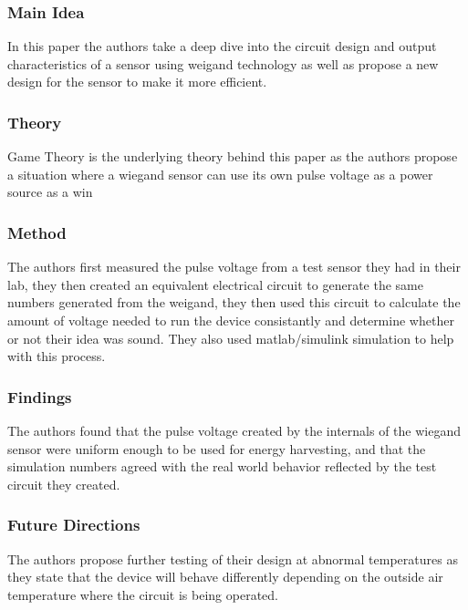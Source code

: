 \subsubsection{Main Idea}

\noindent
In this paper the authors take a deep dive into the circuit design and output characteristics of a sensor using weigand technology as well as propose a new design for the sensor to make it more efficient.

\subsubsection{Theory}

\noindent
Game Theory is the underlying theory behind this paper as the authors propose a situation where a wiegand sensor can use its own pulse voltage as a power source as a win

\subsubsection{Method}

\noindent
The authors first measured the pulse voltage from a test sensor they had in their lab, they then created an equivalent electrical circuit to generate the same numbers generated from the weigand, they then used this circuit to calculate the amount of voltage needed to run the device consistantly and determine whether or not their idea was sound. They also used matlab/simulink simulation to help with this process. 

\subsubsection{Findings}

\noindent
The authors found that the pulse voltage created by the internals of the wiegand sensor were uniform enough to be used for energy harvesting, and that the simulation numbers agreed with the real world behavior reflected by the test circuit they created.

\subsubsection{Future Directions}

\noindent
The authors propose further testing of their design at abnormal temperatures as they state that the device will behave differently depending on the outside air temperature where the circuit is being operated.

